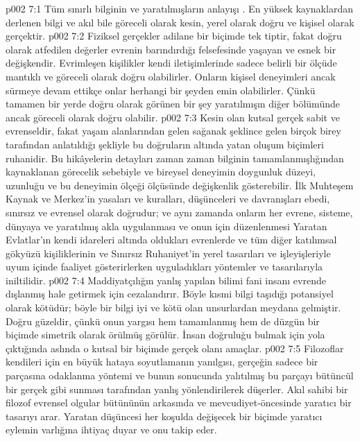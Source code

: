 \vs p002 7:1 Tüm sınırlı bilginin ve yaratılmışların anlayışı . En yüksek kaynaklardan derlenen bilgi ve akıl bile göreceli olarak kesin, yerel olarak doğru ve kişisel olarak gerçektir.
\vs p002 7:2 Fiziksel gerçekler adilane bir biçimde tek tiptir, fakat doğru olarak atfedilen değerler evrenin barındırdığı felsefesinde yaşayan ve esnek bir değişkendir. Evrimleşen kişilikler kendi iletişimlerinde sadece belirli bir ölçüde mantıklı ve göreceli olarak doğru olabilirler. Onların kişisel deneyimleri ancak sürmeye devam ettikçe onlar herhangi bir şeyden emin olabilirler. Çünkü tamamen bir yerde doğru olarak görünen bir şey yaratılmışın diğer bölümünde ancak göreceli olarak doğru olabilir.
\vs p002 7:3 Kesin olan kutsal gerçek sabit ve evrenseldir, fakat yaşam alanlarından gelen sağanak şeklince gelen birçok birey tarafından anlatıldığı şekliyle bu doğruların altında yatan oluşum biçimleri ruhanidir. Bu hikâyelerin detayları zaman zaman bilginin tamamlanmışlığından kaynaklanan görecelik sebebiyle ve bireysel deneyimin doygunluk düzeyi, uzunluğu ve bu deneyimin ölçeği ölçüsünde değişkenlik gösterebilir. İlk Muhteşem Kaynak ve Merkez’in yasaları ve kuralları, düşünceleri ve davranışları ebedi, sınırsız ve evrensel olarak doğrudur; ve aynı zamanda onların her evrene, sisteme, dünyaya ve yaratılmış akla uygulanması ve onun için düzenlenmesi Yaratan Evlatlar’ın kendi idareleri altında oldukları evrenlerde ve tüm diğer katılımsal gökyüzü kişiliklerinin ve Sınırsız Ruhaniyet’in yerel tasarıları ve işleyişleriyle uyum içinde faaliyet gösterirlerken uyguladıkları yöntemler ve tasarılarıyla iniltilidir.
\vs p002 7:4 Maddiyatçılığın yanlış yapılan bilimi fani insanı evrende dışlanmış hale getirmek için cezalandırır. Böyle kısmi bilgi taşıdığı potansiyel olarak kötüdür; böyle bir bilgi iyi ve kötü olan unsurlardan meydana gelmiştir. Doğru güzeldir, çünkü onun yargısı hem tamamlanmış hem de düzgün bir biçimde simetrik olarak örülmüş görülür. İnsan doğruluğu bulmak için yola çıktığında aslında o kutsal bir biçimde gerçek olanı amaçlar.
\vs p002 7:5 Filozoflar kendileri için en büyük hataya soyutlamanın yanılgısı, gerçeğin sadece bir parçasına odaklanma yöntemi ve bunun sonucunda yalıtılmış bu parçayı bütüncül bir gerçek gibi sunması tarafından yanlış yönlendirilerek düşerler. Akıl sahibi bir filozof evrensel olgular bütününün arkasında ve mevcudiyet\hyp{}öncesinde yaratıcı bir tasarıyı arar. Yaratan düşüncesi her koşulda değişecek bir biçimde yaratıcı eylemin varlığına ihtiyaç duyar ve onu takip eder.

